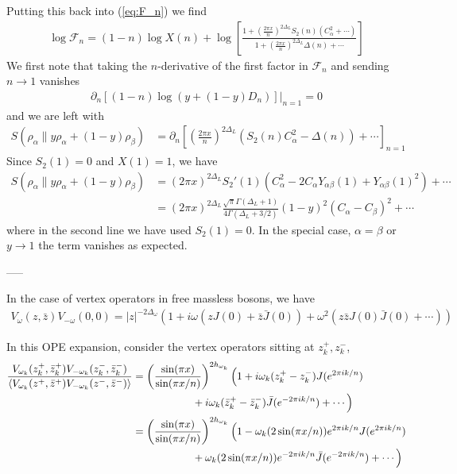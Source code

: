 \documentclass[11pt]{article}
\newcommand{\nn}{\nonumber}
\newcommand{\lb}{\left(}
\newcommand{\rb}{\right)}
\begin{document}
  Putting this back into (\ref{eq:F_n}) we find
  \begin{align}
    \log\mathcal{F}_{n}=(1-n)\log X(n)+\log\left[\frac{1+\lb \frac{2\pi x}{n}\rb^{2\Delta_L}S_{2}(n)\lb C_{\alpha}^{2}+\cdots\rb}{1+\lb \frac{2\pi x}{n}\rb^{2\Delta_L}\Delta(n)+\cdots}\right]
  \end{align}
  We first note that taking the $n$-derivative of the first factor in $\mathcal{F}
  _{n}$ and sending $n\to 1$ vanishes
  \begin{align}
    \partial_{n}\left[(1-n)\log(y+(1-y)D_{n})\right]\Big|_{n=1}=0
  \end{align}
  and we are left with
  \begin{align}
    S(\rho_{\alpha}\|y\rho_{\alpha}+(1-y)\rho_{\beta}) & =\partial_{n}\left[\lb \frac{2\pi x}{n}\rb^{2\Delta_L}(S_{2}(n) C_{\alpha}^{2}-\Delta(n))+\cdots\right]_{n=1}
  \end{align}
  Since $S_{2}(1)=0$ and $X(1)=1$, we have
  \begin{align}\label{eq: relative entropy in small x limit}
    S(\rho_{\alpha}\|y\rho_{\alpha}+(1-y)\rho_{\beta}) & = (2\pi x)^{2\Delta_L}S_{2}'(1)(C_{\alpha}^{2}-2C_{\alpha}Y_{\alpha\beta}(1)+Y_{\alpha\beta}(1)^{2})+\cdots\nn                \\
                                                       & =(2\pi x)^{2\Delta_L}\frac{\sqrt{\pi}\Gamma(\Delta_{L}+1)}{4\Gamma(\Delta_{L}+3/2)}(1-y)^{2}(C_{\alpha}-C_{\beta})^{2}+\cdots
  \end{align}
  where in the second line we have used $S_{2}(1)=0$. In the special case,
  $\alpha =\beta$ or $y\to 1$ the term vanishes as expected. 
  
  
  
  -----
  
  
  In the case of vertex
  operators in free massless bosons, we have
  \begin{align}
    V_{\omega}(z,\bar{z})V_{-\omega}(0,0)=|z|^{-2\Delta_\omega}\lb 1+i\omega\lb z J(0)+\bar{z}\bar{J}(0)\rb+\omega^{2} (z\bar{z}J(0)\bar{J}(0)+\cdots)\rb
  \end{align}


  In this OPE expansion, consider the vertex operators sitting at $z_k^+, z_k^-$,
  \begin{align}
      \frac{V_{\omega_k}(z_k^+ , \bar{z}_k^+) V_{-\omega_k}(z_k^- , \bar{z}_k^-)}{ \langle V_{\omega_k}(z^+ , \bar{z}^+ ) V_{-\omega_k}(z^- , \bar{z}^-)\rangle}  &= \lb
    \frac{\sin(\pi x)}{\sin(\pi x/n)}\rb^{2h_{\omega_k}}  
    \Bigl( 1+i \omega_k (z_k^+ - z_k^-) J(e^{2\pi i k/n})  \nonumber \\
    & \hspace{2cm} + i\omega_k (\bar{z}_k^+ - \bar{z}_k^-) \bar{J}(e^{-2\pi i k/n}) + \cdots \Bigr) \nonumber \\
    &=
    \lb
    \frac{\sin(\pi x)}{\sin(\pi x/n)}\rb^{2h_{\omega_k}}
    \Bigl( 1- \omega_k (2\sin(\pi x /n))e^{2\pi i k/n} J(e^{2\pi i k/n})  \nonumber \\
    &\hspace{2cm}+ \omega_k (2\sin(\pi x /n))e^{-2\pi i k/n} \bar{J}(e^{-2\pi i k/n})  +\cdots \Bigr)
  \end{align} 
\end{document}
